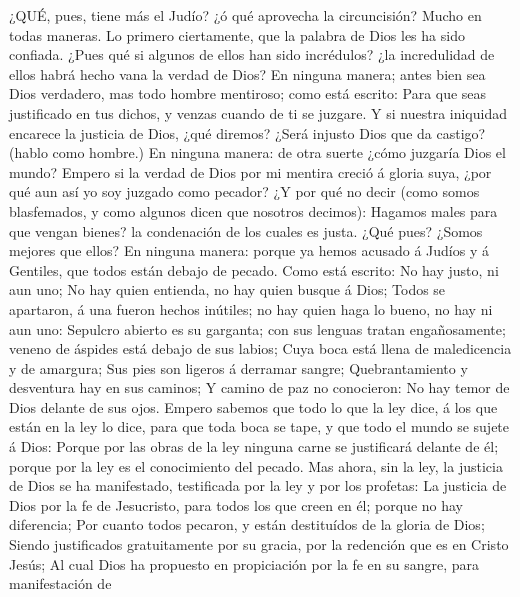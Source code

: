  ¿QUÉ, pues, tiene más el Judío? ¿ó qué aprovecha la
circuncisión?  Mucho en todas maneras. Lo primero
ciertamente, que la palabra de Dios les ha sido confiada. 
¿Pues qué si algunos de ellos han sido incrédulos? ¿la incredulidad de
ellos habrá hecho vana la verdad de Dios?  En ninguna
manera; antes bien sea Dios verdadero, mas todo hombre mentiroso; como
está escrito: Para que seas justificado en tus dichos, y venzas cuando
de ti se juzgare.  Y si nuestra iniquidad encarece la
justicia de Dios, ¿qué diremos? ¿Será injusto Dios que da castigo?
(hablo como hombre.)  En ninguna manera: de otra suerte
¿cómo juzgaría Dios el mundo?  Empero si la verdad de Dios
por mi mentira creció á gloria suya, ¿por qué aun así yo soy juzgado
como pecador?  ¿Y por qué no decir (como somos blasfemados,
y como algunos dicen que nosotros decimos): Hagamos males para que
vengan bienes? la condenación de los cuales es justa.  ¿Qué
pues? ¿Somos mejores que ellos? En ninguna manera: porque ya hemos
acusado á Judíos y á Gentiles, que todos están debajo de pecado.
 Como está escrito: No hay justo, ni aun uno; 
No hay quien entienda, no hay quien busque á Dios;  Todos
se apartaron, á una fueron hechos inútiles; no hay quien haga lo bueno,
no hay ni aun uno:  Sepulcro abierto es su garganta; con
sus lenguas tratan engañosamente; veneno de áspides está debajo de sus
labios;  Cuya boca está llena de maledicencia y de
amargura;  Sus pies son ligeros á derramar sangre;
 Quebrantamiento y desventura hay en sus caminos;
 Y camino de paz no conocieron:  No hay temor
de Dios delante de sus ojos.  Empero sabemos que todo lo
que la ley dice, á los que están en la ley lo dice, para que toda boca
se tape, y que todo el mundo se sujete á Dios:  Porque por
las obras de la ley ninguna carne se justificará delante de él; porque
por la ley es el conocimiento del pecado.  Mas ahora, sin
la ley, la justicia de Dios se ha manifestado, testificada por la ley y
por los profetas:  La justicia de Dios por la fe de
Jesucristo, para todos los que creen en él; porque no hay diferencia;
 Por cuanto todos pecaron, y están destituídos de la gloria
de Dios;  Siendo justificados gratuitamente por su gracia,
por la redención que es en Cristo Jesús;  Al cual Dios ha
propuesto en propiciación por la fe en su sangre, para manifestación de
